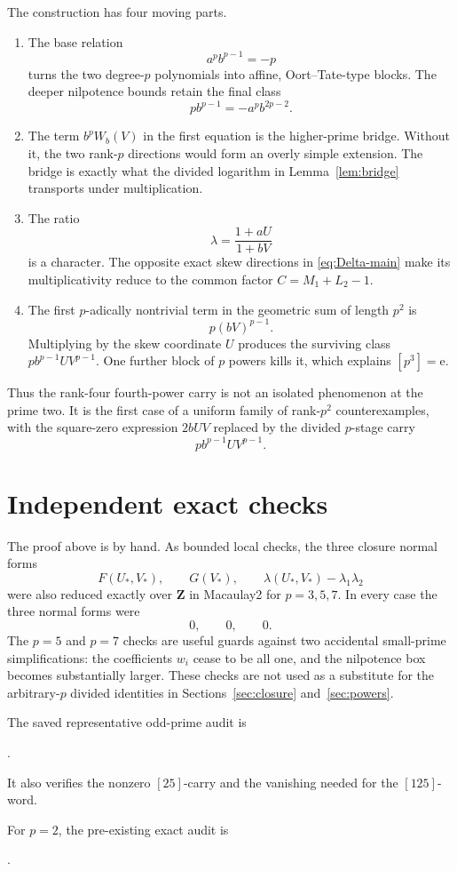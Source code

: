 \documentclass[11pt]{amsart}
\theoremstyle{definition}
\theoremstyle{remark}
\newcommand{\Z}{\mathbf Z}
\newcommand{\unit}{\mathrm e}
\begin{document}
The construction has four moving parts.
\begin{enumerate}
\item The base relation
\[
 a^pb^{p-1}=-p
\]
turns the two degree-\(p\) polynomials into affine, Oort--Tate-type
blocks.  The deeper nilpotence bounds retain the final class
\[
 pb^{p-1}=-a^pb^{2p-2}.
\]
\item The term \(b^pW_b(V)\) in the first equation is the higher-prime
bridge.  Without it, the two rank-\(p\) directions would form an overly
simple extension.  The bridge is exactly what the divided logarithm in
Lemma~\ref{lem:bridge} transports under multiplication.
\item The ratio
\[
 \lambda=\frac{1+aU}{1+bV}
\]
is a character.  The opposite exact skew directions in
\eqref{eq:Delta-main} make its multiplicativity reduce to the common
factor \(C=M_1+L_2-1\).
\item The first \(p\)-adically nontrivial term in the geometric sum of
length \(p^2\) is
\[
 p(bV)^{p-1}.
\]
Multiplying by the skew coordinate \(U\) produces the surviving class
\(pb^{p-1}UV^{p-1}\).  One further block of \(p\) powers kills it, which
explains \([p^3]=\unit\).
\end{enumerate}

Thus the rank-four fourth-power carry is not an isolated phenomenon at
the prime two.  It is the first case of a uniform family of rank-\(p^2\)
counterexamples, with the square-zero expression \(2bUV\) replaced by
the divided \(p\)-stage carry
\[
 p b^{p-1}UV^{p-1}.
\]

\section{Independent exact checks}

The proof above is by hand.  As bounded local checks, the three closure
normal forms
\[
 F(U_*,V_*),\qquad G(V_*),\qquad
 \lambda(U_*,V_*)-\lambda_1\lambda_2
\]
were also reduced exactly over \(\Z\) in Macaulay2 for
\(p=3,5,7\).  In every case the three normal forms were
\[
 0,\qquad0,\qquad0.
\]
The \(p=5\) and \(p=7\) checks are useful guards against two accidental
small-prime simplifications: the coefficients \(w_i\) cease to be all
one, and the nilpotence box becomes substantially larger.  These checks
are not used as a substitute for the arbitrary-\(p\) divided identities
in Sections~\ref{sec:closure} and~\ref{sec:powers}.

The saved representative odd-prime audit is
\begin{center}
.
\end{center}
It also verifies the nonzero \([25]\)-carry and the vanishing needed for
the \([125]\)-word.

For \(p=2\), the pre-existing exact audit is
\begin{center}
.
\end{center}
\end{document}
